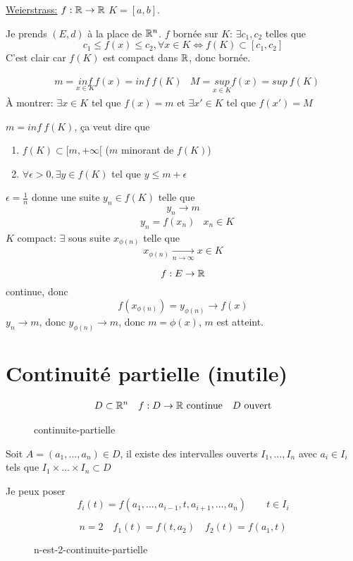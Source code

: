 \begin{preuve}
    \underline{Weierstrass:} $f: \mathbb{R} \to \mathbb{R}$ $K = [a, b]$. \par
    Je prends  $(E, d)$ à la place de  $\mathbb{R}^n$. $f$ bornée sur  $K$:  $\exists c_1, c_2$ telles que 
    \[
    c_1 \le f(x) \le c_2, \forall x \in K \iff f(K) \subset [c_1, c_2] 
\] 
    C'est clair car $f(K)$ est compact dans  $\mathbb{R}$, donc  bornée.
    \par
    \begin{align*}
        &m = \underset{x \in K}{inf} f(x) = inf \: f(K) &M = \underset{x \in K}{sup} f(x) = sup \: f(K)
    \end{align*}
    À montrer: $\exists x \in K$ tel que $f(x) = m$ et  $\exists x' \in K$ tel que $f(x') = M$
    \par
     $m = inf \: f(K)$, ça veut dire que 
      \begin{enumerate}
          \item $f(K) \subset [m, +\infty[$ ($m$ minorant de  $f(K)$)
          \item $\forall \epsilon > 0, \exists y \in f(K)$ tel que $y \le m + \epsilon$
     \end{enumerate}
     $\epsilon = \frac{1}{n}$ donne une suite $y_n \in f(K)$ telle que 
      \[
     y_n \to m
     \] 
     \begin{align*}
         &y_n = f(x_n) &x_n \in K
     \end{align*}
     $K$ compact:   $\exists$ sous suite     $x_{\phi(n)}$ telle que 
      \[
      x_{\phi(n)} \xrightarrow[n \to \infty]{} x \in K
      \] 

     \[
     f: E \to \mathbb{R}
     \] 
     continue, donc 
     \[
         f(x_{\phi(n)}) = y_{\phi(n)} \to f(x) 
     \] 
     $y_n \to m$, donc $y_{\phi(n)} \to m$, donc $m = \phi(x)$,  $m$ est atteint.
\end{preuve}

\section{Continuité partielle (inutile)}
\begin{align*}
    D \subset \mathbb{R}^n  \quad f: D \to \mathbb{R} \text{ continue} \quad D \text{ ouvert}
\end{align*}
\begin{figure}[H]
    \centering
    \caption{continuite-partielle}
    \label{fig:continuite-partielle}
\end{figure}
Soit  $A = (a_1, \ldots, a_n) \in D$, il existe des intervalles ouverts $I_1, \ldots, I_n$ avec $a_i \in I_i$ tels que $I_1 \times \ldots \times I_n \subset D$ 
\par
Je peux poser 
\[
f_i(t) = f(a_1, \ldots, a_{i-1}, t, a_{i+1}, \ldots, a_n) \qquad t \in I_i
\] 
\begin{eg}
   \[
   n = 2 \quad f_1(t) = f(t, a_2) \quad f_2(t) = f(a_1, t)
   \]  
\begin{figure}[H]
    \centering
    \caption{n-est-2-continuite-partielle}
    \label{fig:n-est-2-continuite-partielle}
\end{figure}
\end{eg}

